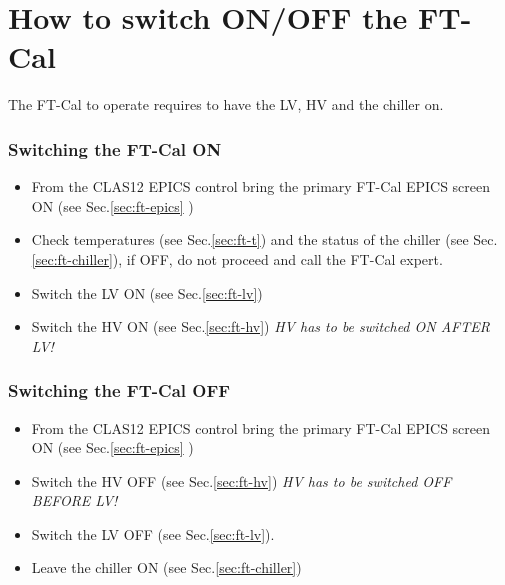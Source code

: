 \documentclass[11.5pt]{article}
\begin{document}
\newpage
\section{How to switch ON/OFF the FT-Cal}
The FT-Cal to operate requires to have the LV, HV and the chiller on. \\

\subsubsection{Switching the FT-Cal ON}
\begin{itemize}
\item{From  the CLAS12 EPICS control bring the primary FT-Cal EPICS screen ON (see Sec.\ref{sec:ft-epics} )}
\item{Check temperatures (see Sec.\ref{sec:ft-t}) and the status of the chiller (see Sec.\ref{sec:ft-chiller}), if OFF, do not proceed and  call the FT-Cal expert.}
\item{Switch the LV ON (see Sec.\ref{sec:ft-lv})}
\item{Switch the HV ON (see Sec.\ref{sec:ft-hv}) {\it HV has to  be switched ON AFTER LV!}}
\end{itemize}

\subsubsection{Switching the FT-Cal OFF}
\begin{itemize}
\item{From  the CLAS12 EPICS control   bring the primary FT-Cal EPICS screen ON (see Sec.\ref{sec:ft-epics} )}
\item{Switch the HV OFF (see Sec.\ref{sec:ft-hv}) {\it HV has to  be switched OFF BEFORE LV!}}
\item{Switch the LV OFF (see Sec.\ref{sec:ft-lv}).}
\item{Leave the chiller ON (see Sec.\ref{sec:ft-chiller})}
\end{itemize}
\end{document}
